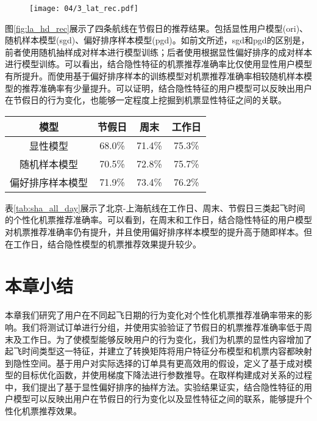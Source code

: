 \begin{figure}
 \centering
 \texttt{[image: 04/3\_lat\_rec.pdf]}
\end{figure}

图\ref{fig:la_hd_rec}展示了四条航线在节假日的推荐结果。包括显性用户模型(ori)、随机样本模型(sgd)、偏好排序样本模型(pgd)。如前文所述，sgd和pgd的区别是，前者使用随机抽样成对样本进行模型训练；后者使用根据显性偏好排序的成对样本进行模型训练。可以看出，结合隐性特征的机票推荐准确率比仅使用显性用户模型有所提升。而使用基于偏好排序样本的训练模型对机票推荐准确率相较随机样本模型的推荐准确率有少量提升。可以证明，结合隐性特征的用户模型可以反映出用户在节假日的行为变化，也能够一定程度上挖掘到机票显性特征之间的关联。


\begin{table}[!h]
  \centering
  \begin{tabular}{|c|c|c|c|} \hline 
模型 & 节假日 & 周末 & 工作日 \\ \hline
显性模型 & 68.0\% & 71.4\% & 75.3\% \\ \hline
随机样本模型 & 70.5\% & 72.8\% & 75.7\% \\ \hline
偏好排序样本模型 & 71.9\% & 73.4\% & 76.2\% \\ \hline
  \end{tabular}
\end{table}

表\ref{tab:sha_all_day}展示了北京-上海航线在工作日、周末、节假日三类起飞时间的个性化机票推荐准确率。可以看到，在周末和工作日，结合隐性特征的用户模型对机票推荐准确率仍有提升，并且使用偏好排序样本模型的提升高于随即样本。但在工作日，结合隐性模型的机票推荐效果提升较少。

\section{本章小结}

本章我们研究了用户在不同起飞日期的行为变化对个性化机票推荐准确率带来的影响。我们将测试订单进行分组，并使用实验验证了节假日的机票推荐准确率低于周末及工作日。为了使模型能够反映用户的行为变化，我们为机票的显性内容增加了起飞时间类型这一特征，并建立了转换矩阵将用户特征分布模型和机票内容都映射到隐性空间。基于用户对实际选择的订单具有更高效用的假设，定义了基于成对模型的目标优化函数，并使用梯度下降法进行参数推导。在取样构建成对关系的过程中，我们提出了基于显性偏好排序的抽样方法。实验结果证实，结合隐性特征的用户模型可以反映出用户在节假日的行为变化以及显性特征之间的联系，能够提升个性化机票推荐效果。